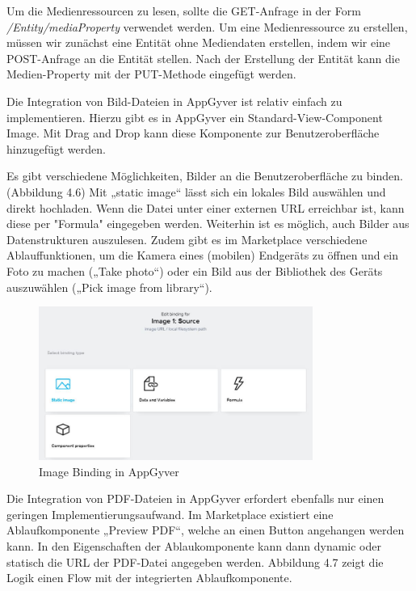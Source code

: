 Um die Medienressourcen zu lesen, sollte die GET-Anfrage in der Form \textit{/Entity/mediaProperty} verwendet werden. Um eine Medienressource zu erstellen, müssen wir zunächst eine Entität ohne Mediendaten erstellen, indem wir eine POST-Anfrage an die Entität stellen. Nach der Erstellung der Entität kann die Medien-Property mit der PUT-Methode eingefügt werden\cite{sapc:smd}. 

Die Integration von Bild-Dateien in AppGyver ist relativ einfach zu implementieren. Hierzu gibt es in AppGyver ein Standard-View-Component Image. Mit Drag and Drop kann diese Komponente zur Benutzeroberfläche hinzugefügt werden. 

Es gibt verschiedene Möglichkeiten, Bilder an die Benutzeroberfläche zu binden. (Abbildung 4.6) Mit „static image“ lässt sich ein lokales Bild auswählen und direkt hochladen. Wenn die Datei unter einer externen URL erreichbar ist, kann diese per "Formula" eingegeben werden. Weiterhin ist es möglich, auch Bilder aus Datenstrukturen auszulesen. Zudem gibt es im Marketplace verschiedene Ablauffunktionen, um die Kamera eines (mobilen) Endgeräts zu öffnen und ein Foto zu machen („Take photo“) oder ein Bild aus der Bibliothek des Geräts auszuwählen („Pick image from library“).

\begin{figure}[htbp]
 \centering
 \includegraphics[width=0.8\textwidth]{Bilder/appgyver/4_6_Image_binding_in_AppGyver.jpg}
 \caption{Image Binding in AppGyver}
\end{figure}

Die Integration von PDF-Dateien in AppGyver erfordert ebenfalls nur einen geringen Implementierungsaufwand. Im Marketplace existiert eine Ablaufkomponente „Preview PDF“, welche an einen Button angehangen werden kann. In den Eigenschaften der Ablaukomponente kann dann dynamic oder statisch die URL der PDF-Datei angegeben werden. Abbildung 4.7 zeigt die Logik einen Flow mit der integrierten Ablaufkomponente. 

